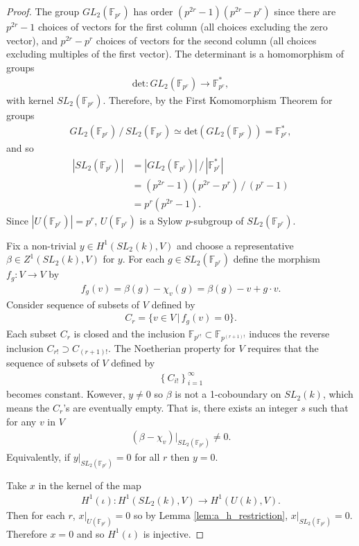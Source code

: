 \begin{proof}
	The group $GL_2(\mathbb{F}_{p^r})$ has order $(p^{2r} - 1)(p^{2r} - p^r)$ since there are $p^{2r} - 1$ choices of vectors for the first column (all choices excluding the zero vector), and $p^{2r} - p^r$ choices of vectors for the second column (all choices excluding multiples of the first vector). The determinant is a homomorphism of groups
	\begin{align}
		\mathrm{det}:GL_2(\mathbb{F}_{p^r}) \rightarrow \mathbb{F}^*_{p^r},
	\end{align}
	with kernel $SL_2(\mathbb{F}_{p^r})$. Therefore, by the First Komomorphism Theorem for groups
	\begin{align}
		GL_2(\mathbb{F}_{p^r})\,/\,SL_2(\mathbb{F}_{p^r}) \simeq \mathrm{det}(GL_2(\mathbb{F}_{p^r})) = \mathbb{F}^*_{p^r},
	\end{align}
	and so
	\begin{align*}
		|SL_2(\mathbb{F}_{p^r})|
		&=  |GL_2(\mathbb{F}_{p^r})|\,/\,|\mathbb{F}^*_{p^r}|\\
		&=  (p^{2r} - 1)(p^{2r} - p^r)\,/\,(p^r - 1)\\
		&=  p^r(p^{2r} - 1).
	\end{align*}
	Since $|U(\mathbb{F}_{p^r})| = p^r$, $U(\mathbb{F}_{p^r})$ is a Sylow $p$-subgroup of $SL_2(\mathbb{F}_{p^r})$.
	
	Fix a non-trivial $y\in H^1(SL_2(k), V)$ and choose a representative $\beta\in Z^1(SL_2(k), V)$ for $y$. For each $g\in SL_2(\mathbb{F}_{p^r})$ define the morphism $f_g:V\rightarrow V$ by
	\begin{align}
		f_g(v) = \beta(g) - \chi_v(g) = \beta(g) - v + g\cdot v.
	\end{align}
	Consider sequence of subsets of $V$ defined by
	\begin{align}
		C_r = \{v \in V \,|\, f_g(v) = 0\}.
	\end{align}
	Each subset $C_r$ is closed and the inclusion $\mathbb{F}_{p^{r!}} \subset \mathbb{F}_{p^{(r+1)!}}$ induces the reverse inclusion $C_{r!} \supset C_{(r+1)!}$. The Noetherian property for $V$ requires that the sequence of subsets of $V$ defined by
	\begin{align}
		\left\{C_{i!}\right\}_{i = 1}^\infty
	\end{align}
	becomes constant. Kowever, $y\neq 0$ so $\beta$ is not a 1-coboundary on $SL_2(k)$, which means the $C_r$'s are eventually empty. That is, there exists an integer $s$ such that for any $v$ in $V$
	\begin{align}
		(\beta - \chi_v)|_{SL_2(\mathbb{F}_{p^s})} \neq 0.
	\end{align}
	Equivalently, if $y|_{SL_2(\mathbb{F}_{p^r})} = 0$ for all $r$ then $y = 0$.
	
	Take $x$ in the kernel of the map 
	\begin{align}
	 H^1(\iota) : H^1(SL_2(k), V) \rightarrow H^1(U(k), V).
       \end{align}
	Then for each $r$, $x|_{U(\mathbb{F}_{p^r})} = 0$ so by Lemma \ref{lem:a_h_restriction}, $x|_{SL_2(\mathbb{F}_{p^r})} = 0$. Therefore $x=0$ and so $H^1(\iota)$ is injective.
\end{proof}

